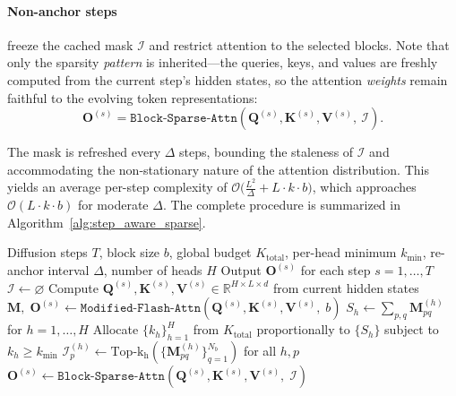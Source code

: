 \paragraph{Non-anchor steps} freeze the cached mask $\mathcal{I}$ and restrict attention to the selected blocks. Note that only the sparsity \emph{pattern} is inherited---the queries, keys, and values are freshly computed from the current step's hidden states, so the attention \emph{weights} remain faithful to the evolving token representations:
\begin{equation}
    \mathbf{O}^{(s)} = \texttt{Block-Sparse-Attn}(\mathbf{Q}^{(s)}, \mathbf{K}^{(s)}, \mathbf{V}^{(s)},\ \mathcal{I}).
\end{equation}

The mask is refreshed every $\Delta$ steps, bounding the staleness of $\mathcal{I}$ and accommodating the non-stationary nature of the attention distribution. This yields an average per-step complexity of $\mathcal{O}\!\bigl(\frac{L^2}{\Delta} + L \cdot k \cdot b\bigr)$, which approaches $\mathcal{O}(L \cdot k \cdot b)$ for moderate $\Delta$. The complete procedure is summarized in Algorithm~\ref{alg:step_aware_sparse}.

\begin{algorithm}[t]
\caption{Step-dLLM Inference}
\label{alg:step_aware_sparse}
\begin{algorithmic}[1]
\Require Diffusion steps $T$, block size $b$, global budget $K_{\text{total}}$, per-head minimum $k_{\min}$, re-anchor interval $\Delta$, number of heads $H$
\Ensure Output $\mathbf{O}^{(s)}$ for each step $s = 1, \ldots, T$
\State $\mathcal{I} \gets \varnothing$ 
    \State Compute $\mathbf{Q}^{(s)}, \mathbf{K}^{(s)}, \mathbf{V}^{(s)} \in \mathbb{R}^{H \times L \times d}$ from current hidden states
     
        \State $\mathbf{M},\; \mathbf{O}^{(s)} \gets \texttt{Modified-Flash-Attn}\!\left(\mathbf{Q}^{(s)}, \mathbf{K}^{(s)}, \mathbf{V}^{(s)},\; b\right)$
        \State $S_h \gets \sum_{p,q} \mathbf{M}^{(h)}_{pq}$ for $h = 1, \ldots, H$
        \State Allocate $\{k_h\}_{h=1}^{H}$ from $K_{\text{total}}$ proportionally to $\{S_h\}$ subject to $k_h \geq k_{\min}$ 
        \State $\mathcal{I}^{(h)}_p \gets \mathrm{Top\text{-}k_h}\!\left(\{\mathbf{M}^{(h)}_{pq}\}_{q=1}^{N_b}\right)$ for all $h, p$
    \Else {}
        \State $\mathbf{O}^{(s)} \gets \texttt{Block-Sparse-Attn}\!\left(\mathbf{Q}^{(s)}, \mathbf{K}^{(s)}, \mathbf{V}^{(s)},\; \mathcal{I}\right)$
    \EndIf
\EndFor
\end{algorithmic}
\end{algorithm}

